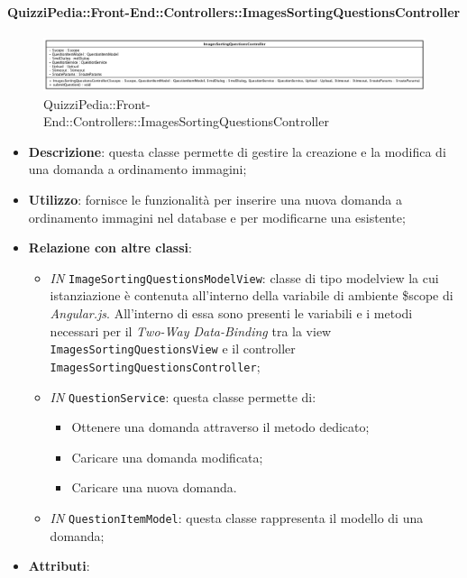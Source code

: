 \paragraph{QuizziPedia::Front-End::Controllers::ImagesSortingQuestionsController}
\begin{figure} [ht]
	\centering
	\includegraphics[scale=0.45]{UML/Classi/Front-End/QuizziPedia_Front-end_Controller_ImagesSortingQuestionsController.png}
	\caption{QuizziPedia::Front-End::Controllers::ImagesSortingQuestionsController}
\end{figure} \FloatBarrier
\begin{itemize}
	\item \textbf{Descrizione}: questa classe permette di gestire la creazione e la modifica di una domanda a ordinamento immagini;
	\item \textbf{Utilizzo}: fornisce le funzionalità per inserire una nuova domanda a ordinamento immagini nel database e per modificarne una esistente;
	\item \textbf{Relazione con altre classi}:
	\begin{itemize}
		\item \textit{IN} \texttt{ImageSortingQuestionsModelView}: classe di tipo modelview la cui istanziazione è contenuta all'interno della variabile di ambiente \$scope di \textit{Angular.js}. All'interno di essa sono presenti le variabili e i metodi necessari per il \textit{Two-Way Data-Binding} tra la view \texttt{ImagesSortingQuestionsView} e il controller \texttt{ImagesSortingQuestionsController};
		\item \textit{IN} \texttt{QuestionService}: questa classe permette di:
		\begin{itemize}
			\item Ottenere una domanda attraverso il metodo dedicato;
			\item Caricare una domanda modificata;
			\item Caricare una nuova domanda.
		\end{itemize}
		\item \textit{IN} \texttt{QuestionItemModel}: questa classe rappresenta il modello di una domanda;
	\end{itemize}
	\item \textbf{Attributi}:
	\begin{itemize}

\end{itemize}
\end{itemize}
